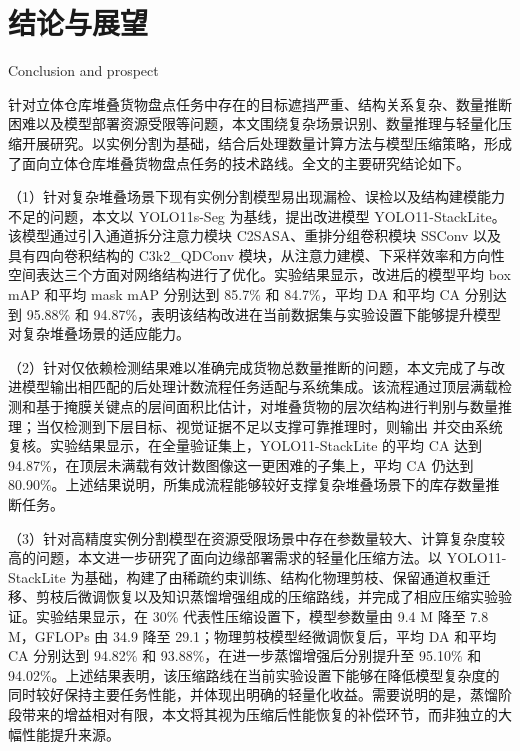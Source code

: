 \chapter{结论与展望}{Conclusion and prospect}

针对立体仓库堆叠货物盘点任务中存在的目标遮挡严重、结构关系复杂、数量推断困难以及模型部署资源受限等问题，本文围绕复杂场景识别、数量推理与轻量化压缩开展研究。以实例分割为基础，结合后处理数量计算方法与模型压缩策略，形成了面向立体仓库堆叠货物盘点任务的技术路线。全文的主要研究结论如下。

\par\noindent
（1）针对复杂堆叠场景下现有实例分割模型易出现漏检、误检以及结构建模能力不足的问题，本文以 YOLO11s-Seg 为基线，提出改进模型 YOLO11-StackLite。该模型通过引入通道拆分注意力模块 C2SASA、重排分组卷积模块 SSConv 以及具有四向卷积结构的 C3k2\_QDConv 模块，从注意力建模、下采样效率和方向性空间表达三个方面对网络结构进行了优化。实验结果显示，改进后的模型平均 box mAP 和平均 mask mAP 分别达到 85.7\% 和 84.7\%，平均 DA 和平均 CA 分别达到 95.88\% 和 94.87\%，表明该结构改进在当前数据集与实验设置下能够提升模型对复杂堆叠场景的适应能力。

\par\noindent
（2）针对仅依赖检测结果难以准确完成货物总数量推断的问题，本文完成了与改进模型输出相匹配的后处理计数流程任务适配与系统集成。该流程通过顶层满载检测和基于掩膜关键点的层间面积比估计，对堆叠货物的层次结构进行判别与数量推理；当仅检测到下层目标、视觉证据不足以支撑可靠推理时，则输出  并交由系统复核。实验结果显示，在全量验证集上，YOLO11-StackLite 的平均 CA 达到 94.87\%，在顶层未满载有效计数图像这一更困难的子集上，平均 CA 仍达到 80.90\%。上述结果说明，所集成流程能够较好支撑复杂堆叠场景下的库存数量推断任务。

\par\noindent
（3）针对高精度实例分割模型在资源受限场景中存在参数量较大、计算复杂度较高的问题，本文进一步研究了面向边缘部署需求的轻量化压缩方法。以 YOLO11-StackLite 为基础，构建了由稀疏约束训练、结构化物理剪枝、保留通道权重迁移、剪枝后微调恢复以及知识蒸馏增强组成的压缩路线，并完成了相应压缩实验验证。实验结果显示，在 30\% 代表性压缩设置下，模型参数量由 9.4 M 降至 7.8 M，GFLOPs 由 34.9 降至 29.1；物理剪枝模型经微调恢复后，平均 DA 和平均 CA 分别达到 94.82\% 和 93.88\%，在进一步蒸馏增强后分别提升至 95.10\% 和 94.02\%。上述结果表明，该压缩路线在当前实验设置下能够在降低模型复杂度的同时较好保持主要任务性能，并体现出明确的轻量化收益。需要说明的是，蒸馏阶段带来的增益相对有限，本文将其视为压缩后性能恢复的补偿环节，而非独立的大幅性能提升来源。

